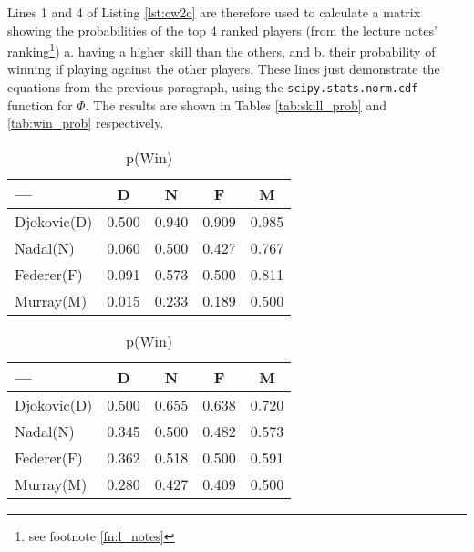 \documentclass[11pt]{amsart}
\begin{document}
Lines 1 and 4 of Listing \ref{lst:cw2c} are therefore used to calculate a matrix showing the probabilities of the top 4 ranked players (from the lecture notes' ranking\footnote{see footnote \ref{fn:l_notes}}) a. having a higher skill than the others, and b. their probability of winning if playing against the other players. These lines just demonstrate the equations from the previous paragraph, using the \verb|scipy.stats.norm.cdf| function for $\Phi$. The results are shown in Tables \ref{tab:skill_prob} and \ref{tab:win_prob} respectively.
\begin{table}
    \centering{}
    \begin{minipage}[t]{0.495\textwidth}
        \begin{center}
            \begin{tabular}{lcccc}\toprule
                ---         & D           & N           & F           & M           \\ \midrule
                Djokovic(D) & \num{0.500} & \num{0.940} & \num{0.909} & \num{0.985} \\
                Nadal(N)    & \num{0.060} & \num{0.500} & \num{0.427} & \num{0.767} \\
                Federer(F)  & \num{0.091} & \num{0.573} & \num{0.500} & \num{0.811} \\
                Murray(M)   & \num{0.015} & \num{0.233} & \num{0.189} & \num{0.500} \\  \bottomrule
            \end{tabular}%
            \par\end{center}
        \caption{p(Higher Skill)} \label{tab:skill_prob}
    \end{minipage}%
    \begin{minipage}[t]{0.495\textwidth}%
        \begin{center}
            \begin{tabular}{lcccc} \toprule
                ---         & D           & N           & F           & M           \\ \midrule
                Djokovic(D) & \num{0.500} & \num{0.655} & \num{0.638} & \num{0.720} \\
                Nadal(N)    & \num{0.345} & \num{0.500} & \num{0.482} & \num{0.573} \\
                Federer(F)  & \num{0.362} & \num{0.518} & \num{0.500} & \num{0.591} \\
                Murray(M)   & \num{0.280} & \num{0.427} & \num{0.409} & \num{0.500} \\ \bottomrule
            \end{tabular}
            \par\end{center}
        \caption{p(Win)} \label{tab:win_prob}
    \end{minipage}%
    \label{tab:taskc_tabs}
\end{table}
\end{document}
